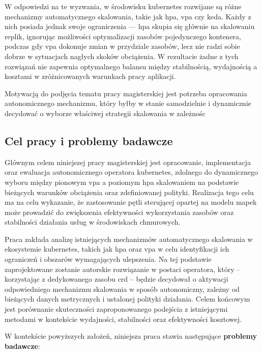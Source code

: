 W odpowiedzi na te wyzwania, w środowisku \Gls{kubernetes} rozwijane są różne mechanizmy 
automatycznego skalowania, takie jak \Gls{hpa}, \Gls{vpa} czy \Gls{keda}. Każdy z nich 
posiada jednak swoje ograniczenia — \Gls{hpa} skupia się głównie na skalowaniu replik, 
ignorując możliwości optymalizacji zasobów pojedynczego kontenera, podczas gdy \Gls{vpa} 
dokonuje zmian w przydziale zasobów, lecz nie radzi sobie dobrze w sytuacjach nagłych 
skoków obciążenia. W rezultacie żadne z tych rozwiązań nie zapewnia optymalnego balansu 
między stabilnością, wydajnością a kosztami w zróżnicowanych warunkach pracy aplikacji.

Motywacją do podjęcia tematu pracy magisterskiej jest potrzeba opracowania autonomicznego 
mechanizmu, który byłby w stanie samodzielnie i dynamicznie decydować o wyborze właściwej 
strategii skalowania w zależnośc

\subsection{Cel pracy i problemy badawcze}

Głównym celem niniejszej pracy magisterskiej jest opracowanie, implementacja oraz ewaluacja 
autonomicznego operatora \Gls{kubernetes}, zdolnego do dynamicznego wyboru między pionowym 
\Gls{vpa} a poziomym \Gls{hpa} skalowaniem na podstawie bieżących warunków obciążenia oraz 
zdefiniowanej polityki. Realizacja tego celu ma na celu wykazanie, że zastosowanie pętli 
sterującej opartej na modelu \Gls{mapek} może prowadzić do zwiększenia efektywności 
wykorzystania zasobów oraz stabilności działania usług w środowiskach chmurowych.

Praca zakłada analizę istniejących mechanizmów automatycznego skalowania w ekosystemie 
\Gls{kubernetes}, takich jak \Gls{hpa} oraz \Gls{vpa} w celu identyfikacji ich ograniczeń 
i obszarów wymagających ulepszenia. Na tej podstawie zaprojektowane zostanie autorskie 
rozwiązanie w postaci operatora, który – korzystając z dedykowanego zasobu \Gls{crd} – 
będzie decydował o aktywacji odpowiedniego mechanizmu skalowania w sposób autonomiczny, 
zależny od bieżących danych metrycznych i ustalonej polityki działania. Celem końcowym 
jest porównanie skuteczności zaproponowanego podejścia z istniejącymi metodami w kontekście 
wydajności, stabilności oraz efektywności kosztowej.

W kontekście powyższych założeń, niniejsza praca stawia następujące \textbf{problemy badawcze}:

